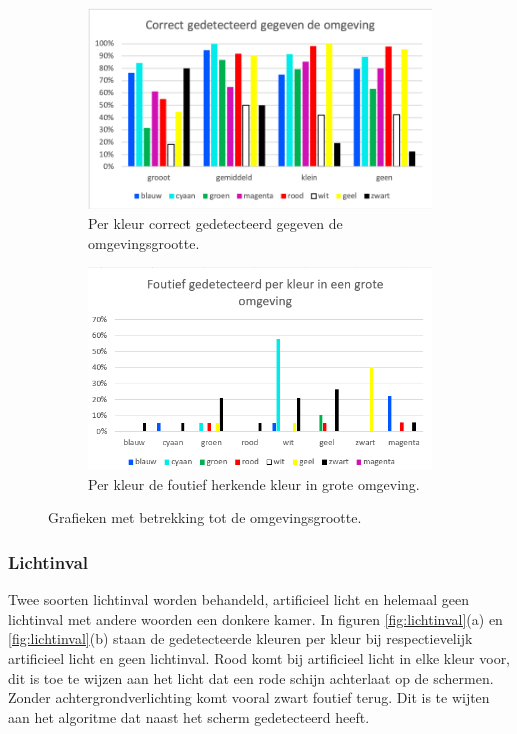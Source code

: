 \begin{figure}
	\begin{subfigure}{0.5\textwidth}
	\centering
	\includegraphics[scale=0.6]{img/Environment}
	\caption{Per kleur correct gedetecteerd gegeven de omgevingsgrootte.}
	\end{subfigure}
	\begin{subfigure}{0.5\textwidth}
	\centering
	\includegraphics[scale=0.6]{img/BigEnvPerColor}
	\caption{Per kleur de foutief herkende kleur in grote omgeving.}
	\end{subfigure}
	\caption{Grafieken met betrekking tot de omgevingsgrootte.}
	\label{fig:omgeving}
\end{figure}

\subsubsection{Lichtinval}
Twee soorten lichtinval worden behandeld, artificieel licht en helemaal geen lichtinval met andere woorden een donkere kamer. In figuren \ref{fig:lichtinval}(a) en \ref{fig:lichtinval}(b) staan de gedetecteerde kleuren per kleur bij respectievelijk artificieel licht en geen lichtinval. Rood komt bij artificieel licht in elke kleur voor, dit is toe te wijzen aan het licht dat een rode schijn achterlaat op de schermen. Zonder achtergrondverlichting  komt vooral zwart foutief terug. Dit is te wijten aan het algoritme dat naast het scherm gedetecteerd heeft.

